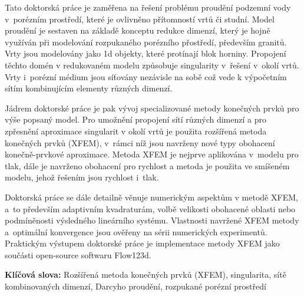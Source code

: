 \documentclass[bibliography=totocnumbered,dvipsnames,FM,Dis]{tulthesis}
\begin{document}


\begin{abstractCZ}
Tato doktorská práce je zaměřena na řešení problému proudění podzemní vody v~porézním prostředí, které
je ovlivněno přítomností vrtů či studní. Model proudění je sestaven na základě konceptu redukce dimenzí,
který je hojně využíván při modelování rozpukaného porézního přostředí, především granitů.
Vrty jsou modelovány jako 1d objekty, které protínají blok horniny. 
Propojení těchto domén v redukovaném modelu způsobuje singularity v~řešení v~okolí vrtů.
Vrty i~porézní médium jsou síťovány nezávisle na sobě což vede k výpočetním sítím kombinujícím elementy
různých dimenzí.

Jádrem doktorské práce je pak vývoj specializované metody konečných prvků pro výše popsaný model. 
Pro umožnění propojení sítí různých dimenzí a pro zpřesnění aproximace singularit v okolí vrtů je 
použita rozšířená metoda konečných prvků (XFEM), v~rámci níž jsou navrženy nové typy obohacení
konečně-prvkové aproximace.
Metoda XFEM je nejprve aplikována v~modelu pro tlak, dále je navrženo obohacení pro rychlost a metoda
je použita ve smíšeném modelu, jehož řešením jsou rychlost i~tlak.

Doktorská práce se dále detailně věnuje numerickým aspektům v metodě XFEM, a~to především 
adaptivním kvadraturám, volbě velikosti obohacené oblasti nebo podmíněnosti výsledného lineárního systému.
Vlastnosti navržené XFEM metody a~optimální konvergence jsou ověřeny na sérii numerických experimentů.
Praktickým výstupem doktorské práce je implementace metody XFEM jako součásti open-source softwaru Flow123d.

\vspace{1cm}
\textbf{Klíčová slova: } Rozšířená metoda konečných prvků (XFEM), singularita, sítě kombinovaných dimenzí,
                         Darcyho proudění, rozpukané porézní prostředí

\end{abstractCZ}

\vspace{2cm}
\end{document}
